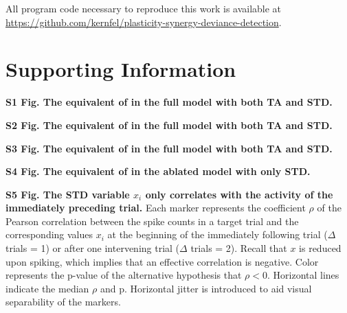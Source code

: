 \documentclass[9pt,lineno,onehalfspacing]{elife}
\begin{document}
All program code necessary to reproduce this work is available at \\
\url{https://github.com/kernfel/plasticity-synergy-deviance-detection}.



\section{Supporting Information}

\textbf{S1 Fig. The equivalent of  in the full model with both TA and STD.}

\textbf{S2 Fig. The equivalent of  in the full model with both TA and STD.}

\textbf{S3 Fig. The equivalent of  in the full model with both TA and STD.}

\textbf{S4 Fig. The equivalent of  in the ablated model with only STD.}

\textbf{S5 Fig. The STD variable $x_i$ only correlates with the activity of the immediately preceding trial.}
Each marker represents the coefficient $\rho$ of the Pearson correlation between the spike counts in a target trial and the corresponding values $x_i$ at the beginning of the immediately following trial ($\Delta$ trials = 1) or after one intervening trial ($\Delta$ trials = 2). Recall that $x$ is reduced upon spiking, which implies that an effective correlation is negative. Color represents the p-value of the alternative hypothesis that $\rho < 0$. Horizontal lines indicate the median $\rho$ and p. Horizontal jitter is introduced to aid visual separability of the markers.
\end{document}

